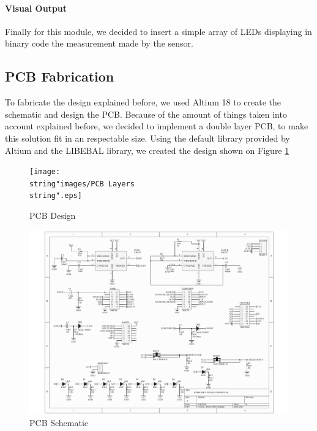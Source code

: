\paragraph{Visual Output}

Finally for this module, we decided to insert a simple array of LEDs
displaying in binary code the measurement made by the sensor.

\subsection{PCB Fabrication}

To fabricate the design explained before, we used Altium 18 to create
the schematic and design the PCB. Because of the amount of things
taken into account explained before, we decided to implement a double
layer PCB, to make this solution fit in an respectable size. Using
the default library provided by Altium and the LIBEBAL library, we
created the design shown on Figure \ref{8_9}

\begin{figure}[H]
\begin{centering}
\texttt{[image: \\string"images/PCB Layers\\string".eps]}
\par\end{centering}
\caption{PCB Design}
\label{8_9}
\end{figure}

\begin{figure}[H]
\begin{centering}
\includegraphics[scale=0.6]{Schematic}
\par\end{centering}
\caption{PCB Schematic}

\end{figure}

